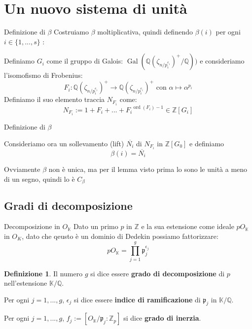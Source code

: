 \documentclass[handout]{beamer}
\theoremstyle{plain}
\theoremstyle{remark}
\theoremstyle{definition}
\newtheorem{deff}[teo]{Definizione}
\newcommand{\Z}{\mathbb{Z}}
\newcommand{\K}{\mathbb{K}}
\newcommand{\Q}{\mathbb{Q}}
\DeclareMathOperator{\Gal}{Gal}
\DeclareMathOperator{\ord}{ord}
\begin{document}
\section{Un nuovo sistema di unità}
	
	\begin{frame}{Definizione di $\beta$}
		Costruiamo $\beta$ moltiplicativa, quindi definendo $ \beta (i) $ per ogni $ i \in \{ 1 , ... , s\} $ :

		Definiamo $ G_i $ come il gruppo di Galois: $ \Gal ( \Q(\zeta_{n/p_i^{e_i}})^+ / \Q)) $ e consideriamo l'isomofismo di Frobenius:
		\[ F_i : \Q(\zeta_{n/p_i^{e_i}})^+ \to \Q(\zeta_{n/p_i^{e_i}})^+ \text{ con }  \alpha \mapsto \alpha ^ {p_i}\] \pause
		 Definiamo il suo elemento traccia $ N_{F_i} $ come:
		 \[ N_{F_i} := 1 + F_i + ... + {F_i}^{\ord (F_i) - 1} \in  \Z [G_i] \] 
	\end{frame}
	
	\begin{frame}{Definizione di $\beta$}
		\begin{block}{}
				 Consideriamo ora un sollevamento (lift) $ \overline{N_i} $ di $ N_{F_i} $ in $ \Z[G_0] $ e definiamo
				 \[ \beta (i) =  \overline{N_i} \]
		\end{block}\pause
			 
		Ovviamente $\beta$ non è unica, ma per il lemma visto prima lo sono le unità a meno di un segno, quindi lo è $ C_\beta $
	\end{frame}
	
\subsection{Gradi di decomposizione}
	
	\begin{frame}{Decomposizione in $ O_\K $}
		Dato un primo $ p $ in $ \Z $ e la sua estensione come ideale $ pO_\K $ in $ O_K $, dato che qeusto è un dominio di Dedekin possiamo fattorizzare:
			\begin{equation}\label{eq:fact_p}
				pO_\K = \prod_{j=1}^g \mathfrak{p}_j^{\epsilon _j}
			\end{equation} 
			\pause
			\begin{deff} \label{def:degree}
				Il numero $ g $ si dice essere \textbf{grado di decomposizione} di $ p $ nell'estensione $ \K / \Q $.
				
				Per ogni $ j=1, ..., g $, $ \epsilon _j $ si dice essere \textbf{indice di ramificazione} di $ \mathfrak{p}_j $ in $ \K / \Q $.
				
				Per ogni $ j=1, ..., g $, $ f_j := [O_\K / \mathfrak{p}_j : \Z_p ] $ si dice \textbf{grado di inerzia}.
			\end{deff}
	\end{frame}
\end{document}
